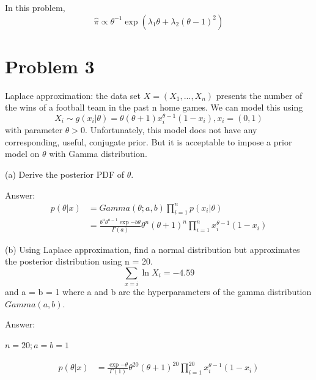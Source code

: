 \documentclass{article}
\begin{document}
In this problem,
\begin{equation}
\hat{\pi} \propto \theta^{-1} \exp(\lambda_{1}\theta+\lambda_{2}(\theta-1)^2)  
\end{equation}

\newpage
\section{Problem 3}
Laplace approximation: the data set $X= (X_1,...,X_n)$ presents the number of the wins of a football team in the past n home games. We can model this using 
\begin{equation}
    X_{i} \sim g(x_{i}|\theta) = \theta (\theta+1)x_{i}^{\theta -1}(1-x_{i}), x_{i} = (0,1)
\end{equation}
with parameter $\theta > 0$. Unfortunately, this model does not have any corresponding, useful, conjugate prior. But it is acceptable to impose a prior model on $\theta$ with Gamma distribution.

(a) Derive the posterior PDF of $\theta$.

Answer:
\begin{equation}
\begin{aligned}
    p(\theta | x) &= Gamma(\theta;a,b) \prod_{i=1}^{n}p(x_{i}|\theta) \\
    &= \frac{b^{a}\theta^{a-1}\exp{-b\theta}}{\Gamma(a)}\theta^{n}(\theta+1)^{n}\prod_{i=1}^{n}x_{i}^{\theta-1}(1-x_{i})
\end{aligned}
\end{equation}

(b) Using Laplace approximation, find a normal distribution but approximates the posterior distribution using n = 20.
\begin{equation}
    \sum_{x=i} \ln X_{i} = -4.59
\end{equation}
and a = b = 1 where a and b are the hyperparameters of the gamma distribution $Gamma(a,b)$.

Answer:

\begin{math}
n = 20; a=b=1
\end{math}

\begin{equation}
\begin{aligned}
    p(\theta | x) 
    &= \frac{\exp{-\theta}}{\Gamma(1)}\theta^{20}(\theta+1)^{20}\prod_{i=1}^{20}x_{i}^{\theta-1}(1-x_{i})
\end{aligned}
\end{equation}
\end{document}
